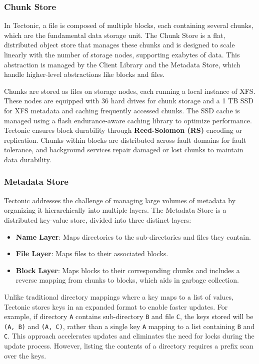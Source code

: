 \subsubsection{Chunk Store}\label{sec:chunk_store}
In Tectonic, a file is composed of multiple blocks, each containing several chunks, which are the fundamental data storage unit. The Chunk Store is a flat, distributed object store that manages these chunks and is designed to scale linearly with the number of storage nodes, supporting exabytes of data. This abstraction is managed by the Client Library and the Metadata Store, which handle higher-level abstractions like blocks and files.

Chunks are stored as files on storage nodes, each running a local instance of XFS. These nodes are equipped with 36 hard drives for chunk storage and a 1 TB SSD for XFS metadata and caching frequently accessed chunks. The SSD cache is managed using a flash endurance-aware caching library to optimize performance. Tectonic ensures block durability through \textbf{Reed-Solomon (RS)}\cite{ReedSolomon} encoding or replication. Chunks within blocks are distributed across fault domains for fault tolerance, and background services repair damaged or lost chunks to maintain data durability.

\subsubsection{Metadata Store}\label{sec:metadata_store}
Tectonic addresses the challenge of managing large volumes of metadata by organizing it hierarchically into multiple layers. The Metadata Store is a distributed key-value store, divided into three distinct layers:

\begin{itemize}\label{list:metadata_layers}
    \item \textbf{Name Layer}: Maps directories to the sub-directories and files they contain.
    \item \textbf{File Layer}: Maps files to their associated blocks.
    \item \textbf{Block Layer}: Maps blocks to their corresponding chunks and includes a reverse mapping from chunks to blocks, which aids in garbage collection.
\end{itemize}

Unlike traditional directory mappings where a key maps to a list of values, Tectonic stores keys in an expanded format to enable faster updates. For example, if directory \texttt{A} contains sub-directory \texttt{B} and file \texttt{C}, the keys stored will be \texttt{(A, B)} and \texttt{(A, C)}, rather than a single key \texttt{A} mapping to a list containing \texttt{B} and \texttt{C}. This approach accelerates updates and eliminates the need for locks during the update process. However, listing the contents of a directory requires a prefix scan over the keys.

